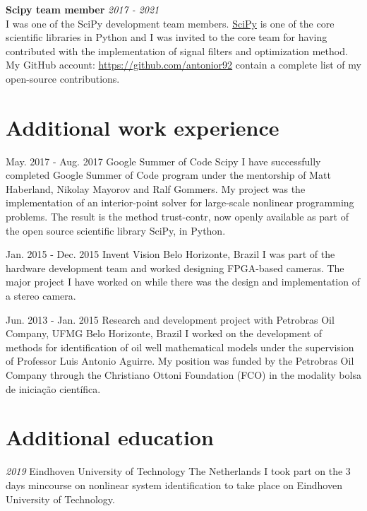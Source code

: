 \documentclass[10pt,letterpaper]{article} %
\begin{document}
{\bf Scipy team member} \hfill {\em 2017 - 2021} \\
I was one of the SciPy development team members.
\href{https://www.scipy.org}{SciPy} is one of the core scientific libraries in Python and I was invited to the core team
for having contributed with the implementation of signal filters
and optimization method.
My GitHub account: \href{https://github.com/antonior92}{https://github.com/antonior92}
contain a complete list of my open-source contributions.

\section*{Additional work experience} %


    { May. 2017 -   Aug. 2017 }
    { Google Summer of Code }
    { Scipy }
    { I have successfully completed Google Summer of Code program under the mentorship of Matt Haberland, Nikolay Mayorov and Ralf Gommers. My project was the implementation of an interior-point solver for large-scale nonlinear programming problems. The result is the method trust-contr, now openly available as part of the open source scientific library SciPy, in Python. }

    { Jan. 2015 -   Dec. 2015 }
    { Invent Vision }
    { Belo Horizonte, Brazil }
    { I was part of the hardware development team and worked designing FPGA-based cameras. The major project I have worked on while there was the design and implementation of a stereo camera. }

    { Jun. 2013 -   Jan. 2015 }
    { Research and development project with Petrobras Oil Company, UFMG }
    { Belo Horizonte, Brazil }
    { I worked on the development of methods for identification of oil well mathematical models under the supervision of Professor Luis Antonio Aguirre. My position was funded by the Petrobras Oil Company through the Christiano Ottoni Foundation (FCO) in the modality bolsa de iniciação científica. }



\section*{Additional education}


    {\em  2019 }
    { Eindhoven University of Technology }
    { The Netherlands }
    { I took part on the 3 days mincourse on nonlinear system identification to take place on Eindhoven University of Technology. }
\end{document}
